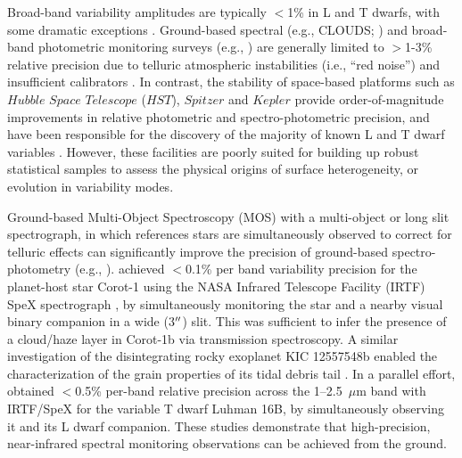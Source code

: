 \documentclass[twocolumn]{aastex6}
\begin{document}
Broad-band variability amplitudes are typically $<$1\% in L and T dwarfs, with some dramatic exceptions \citep{2009ApJ...701.1534A,2012ApJ...750..105R,2013A&A...555L...5G,2016ApJ...829L..32L}. 
Ground-based spectral (e.g., CLOUDS; \citealt{2008A&A...487..277G}) and broad-band photometric monitoring surveys (e.g., \citealt{1999A&A...348..800B,2003MNRAS.346..473K,2014ApJ...793...75R,2014A&A...566A.111W}) are generally limited to $>$1-3\% relative precision due to telluric atmospheric instabilities (i.e., ``red noise'') and insufficient calibrators \citep{2003MNRAS.339..477B}.
In contrast, the stability of space-based platforms such as $Hubble$ $Space$ $Telescope$ ($HST$), $Spitzer$ and $Kepler$ provide order-of-magnitude improvements in relative photometric and spectro-photometric precision, and have been responsible for the discovery of the majority of known L and T dwarf variables \citep{2013ApJ...768..121A,2013ApJ...779..172G,2015ApJ...799..154M}. However, these facilities are poorly suited for building up robust statistical samples to assess the physical origins of surface heterogeneity, or evolution in variability modes. 

Ground-based Multi-Object Spectroscopy (MOS) with a multi-object or long slit spectrograph, in which references stars are simultaneously observed to correct for telluric effects can significantly improve the precision of ground-based spectro-photometry (e.g., \citealt{bean10,bean2013,gibson13clouds,stevenson2016hatp26}). \citet{2014ApJ...783....5S} achieved $<$0.1\% per band variability precision for the planet-host star Corot-1 using the NASA Infrared Telescope Facility (IRTF) SpeX spectrograph \citep{2003PASP..115..362R}, by simultaneously monitoring the star and a nearby visual binary companion in a wide (3$\mbox{$^{\prime\prime}$}$) slit. This was sufficient to infer the presence of a cloud/haze layer in Corot-1b via transmission spectroscopy. A similar investigation of the disintegrating rocky exoplanet KIC 12557548b  enabled the characterization of the grain properties of its tidal debris tail \citep{2016ApJ...826..156S}. In a parallel effort, \citet{2014ApJ...785...48B} obtained $<$0.5\% per-band relative precision across the 1--2.5~$\mu$m band with IRTF/SpeX for the variable T dwarf Luhman 16B, by simultaneously observing it and its L dwarf companion. These studies demonstrate that high-precision, near-infrared spectral monitoring observations can be achieved from the ground.
\end{document}
